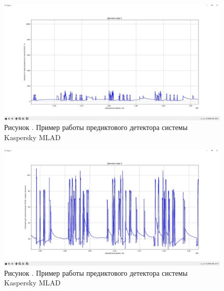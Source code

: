      \begin{figure}
  	\centering
  	\def\svgwidth{\textwidth}
  	\includegraphics[scale=0.6]{images/data_1_visual_3.jpg}
  	\caption*{\gostFont Рисунок \thechaptercntr .\theimagecntr \spc {--} Пример работы предиктового детектора системы Kaspersky MLAD}
  	\label{fig:MLADBlackBox}
  \end{figure} \addtocounter{imagecntr}{1}
  
     \begin{figure}
  	\centering
  	\def\svgwidth{\textwidth}
  	\includegraphics[scale=0.6]{images/data_3_visual_3.jpg}
  	\caption*{\gostFont Рисунок \thechaptercntr .\theimagecntr \spc {--} Пример работы предиктового детектора системы Kaspersky MLAD}
  	\label{fig:MLADBlackBox}
  \end{figure} \addtocounter{imagecntr}{1}
  

